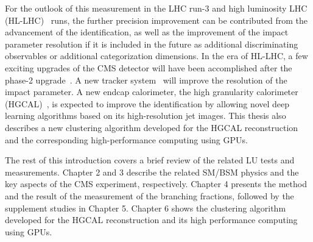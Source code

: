For the outlook of this measurement in the LHC run-3 and high luminosity LHC (HL-LHC)~\cite{Apollinari:2284929} runs, the further precision improvement can be contributed from the advancement of the \PGth identification, as well as the improvement of the impact parameter resolution if it is included in the future as additional discriminating observables or additional categorization dimensions. In the era of HL-LHC, a few exciting upgrades of the CMS detector will have been accomplished after the phase-2 upgrade~\cite{CMSCollaboration:2015zni}. A new tracker system~\cite{Klein:2017nke} will improve the resolution of the impact parameter. A new endcap calorimeter, the high granularity calorimeter (HGCAL)~\cite{Collaboration:2293646}, is expected to improve the \PGth identification by allowing novel deep learning algorithms based on its high-resolution jet images. This thesis also describes a new clustering algorithm developed for the HGCAL reconstruction and the corresponding high-performance computing using GPUs.



The rest of this introduction covers a brief review of the related LU tests and \absVcs measurements. Chapter 2 and 3 describe the related SM/BSM physics and the key aspects of the CMS experiment, respectively. Chapter 4 presents the method and the result of the measurement of the \PW branching fractions, followed by the supplement studies in Chapter 5. Chapter 6 shows the clustering algorithm developed for the HGCAL reconstruction and its high performance computing using GPUs.
